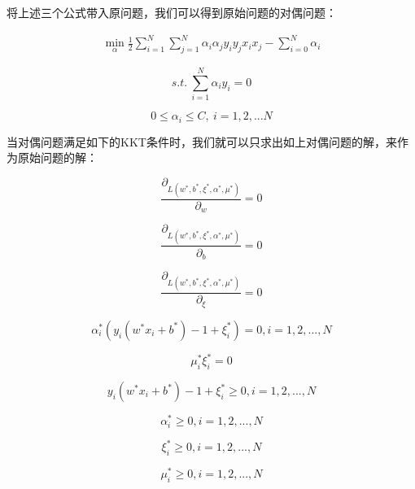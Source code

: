 	将上述三个公式带入原问题，我们可以得到原始问题的对偶问题：
	
	\begin{gather}
	\min_{\alpha} \frac{1}{2}\sum_{i=1}^{N}\sum_{j=1}^{N}\alpha_i \alpha_j y_i y_j x_i x_j - \sum_{i=0}^{N} \alpha_i
	\end{gather}
	
	\begin{equation}
	s.t.\ \sum_{i=1}^{N} \alpha_i y_i = 0
	\end{equation}
	
	\begin{equation}
	0 \leq \alpha_i \leq C, \ i=1,2,...N
	\end{equation}
	
	当对偶问题满足如下的KKT条件时，我们就可以只求出如上对偶问题的解，来作为原始问题的解：
	
	\begin{equation}
		\frac{\partial_{L(w^*,b^*,\xi^*,\alpha^*,\mu^*)}}{\partial_w} = 0
	\end{equation}

	\begin{equation}
		\frac{\partial_{L(w^*,b^*,\xi^*,\alpha^*,\mu^*)}}{\partial_b} = 0
	\end{equation}
	
	\begin{equation}
		\frac{\partial_{L(w^*,b^*,\xi^*,\alpha^*,\mu^*)}}{\partial_{\xi}} = 0
	\end{equation}
	
	\begin{equation}
		\alpha_i^*(y_i(w^*x_i+b^*)-1 + \xi^*_i)=0,i=1,2,...,N
	\end{equation}
	
	\begin{equation}
		\mu_i^* \xi_i^* = 0
	\end{equation}
	
	\begin{equation}
		y_i(w^*x_i+b^*)-1 + \xi_i^* \geq 0,i=1,2,...,N
	\end{equation}
	
	\begin{equation}
		\alpha_i^* \geq 0,i=1,2,...,N
	\end{equation}
	
	\begin{equation}
		\xi_i^* \geq 0,i=1,2,...,N
	\end{equation}
	
	\begin{equation}
		\mu_i^* \geq 0,i=1,2,...,N
	\end{equation}
	
